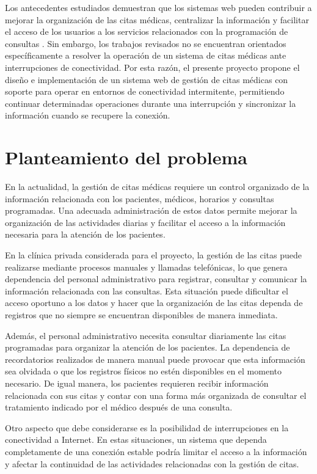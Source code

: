 Los antecedentes estudiados demuestran que los sistemas web pueden contribuir a mejorar la organización de las citas médicas, centralizar la información y facilitar el acceso de los usuarios a los servicios relacionados con la programación de consultas \parencite{diaz2019,nolasco2019,herrera2021,mera2022,valera2024}. Sin embargo, los trabajos revisados no se encuentran orientados específicamente a resolver la operación de un sistema de citas médicas ante interrupciones de conectividad. Por esta razón, el presente proyecto propone el diseño e implementación de un sistema web de gestión de citas médicas con soporte para operar en entornos de conectividad intermitente, permitiendo continuar determinadas operaciones durante una interrupción y sincronizar la información cuando se recupere la conexión.

\section{Planteamiento del problema}

En la actualidad, la gestión de citas médicas requiere un control organizado de la información relacionada con los pacientes, médicos, horarios y consultas programadas. Una adecuada administración de estos datos permite mejorar la organización de las actividades diarias y facilitar el acceso a la información necesaria para la atención de los pacientes.

En la clínica privada considerada para el proyecto, la gestión de las citas puede realizarse mediante procesos manuales y llamadas telefónicas, lo que genera dependencia del personal administrativo para registrar, consultar y comunicar la información relacionada con las consultas. Esta situación puede dificultar el acceso oportuno a los datos y hacer que la organización de las citas dependa de registros que no siempre se encuentran disponibles de manera inmediata.

Además, el personal administrativo necesita consultar diariamente las citas programadas para organizar la atención de los pacientes. La dependencia de recordatorios realizados de manera manual puede provocar que esta información sea olvidada o que los registros físicos no estén disponibles en el momento necesario. De igual manera, los pacientes requieren recibir información relacionada con sus citas y contar con una forma más organizada de consultar el tratamiento indicado por el médico después de una consulta.

Otro aspecto que debe considerarse es la posibilidad de interrupciones en la conectividad a Internet. En estas situaciones, un sistema que dependa completamente de una conexión estable podría limitar el acceso a la información y afectar la continuidad de las actividades relacionadas con la gestión de citas.

